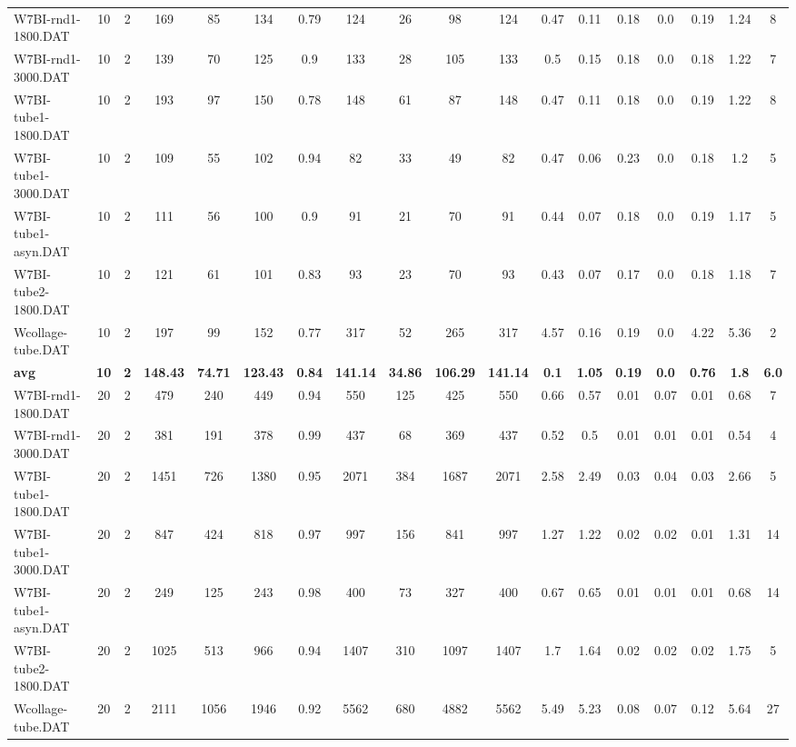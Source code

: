 \begin{sidewaystable}[h]
{\begin{tabular}{lccccccccccccccccc}
W7BI-rnd1-1800.DAT & 10 & 2 & 169 & 85 & 134 & 0.79 & 124 & 26 & 98 & 124 & 0.47 & 0.11 & 0.18 & 0.0 & 0.19 & 1.24 & 8\\
W7BI-rnd1-3000.DAT & 10 & 2 & 139 & 70 & 125 & 0.9 & 133 & 28 & 105 & 133 & 0.5 & 0.15 & 0.18 & 0.0 & 0.18 & 1.22 & 7\\
W7BI-tube1-1800.DAT & 10 & 2 & 193 & 97 & 150 & 0.78 & 148 & 61 & 87 & 148 & 0.47 & 0.11 & 0.18 & 0.0 & 0.19 & 1.22 & 8\\
W7BI-tube1-3000.DAT & 10 & 2 & 109 & 55 & 102 & 0.94 & 82 & 33 & 49 & 82 & 0.47 & 0.06 & 0.23 & 0.0 & 0.18 & 1.2 & 5\\
W7BI-tube1-asyn.DAT & 10 & 2 & 111 & 56 & 100 & 0.9 & 91 & 21 & 70 & 91 & 0.44 & 0.07 & 0.18 & 0.0 & 0.19 & 1.17 & 5\\
W7BI-tube2-1800.DAT & 10 & 2 & 121 & 61 & 101 & 0.83 & 93 & 23 & 70 & 93 & 0.43 & 0.07 & 0.17 & 0.0 & 0.18 & 1.18 & 7\\
Wcollage-tube.DAT & 10 & 2 & 197 & 99 & 152 & 0.77 & 317 & 52 & 265 & 317 & 4.57 & 0.16 & 0.19 & 0.0 & 4.22 & 5.36 & 2\\
\cline{1-18} \textbf{avg} & \textbf{10} & \textbf{2} & \textbf{148.43} & \textbf{74.71} & \textbf{123.43} & \textbf{0.84} & \textbf{141.14} & \textbf{34.86} & \textbf{106.29} & \textbf{141.14} & \textbf{0.1} & \textbf{1.05} & \textbf{0.19} & \textbf{0.0} & \textbf{0.76} & \textbf{1.8} & \textbf{6.0} \\ \cline{1-18}
W7BI-rnd1-1800.DAT & 20 & 2 & 479 & 240 & 449 & 0.94 & 550 & 125 & 425 & 550 & 0.66 & 0.57 & 0.01 & 0.07 & 0.01 & 0.68 & 7\\
W7BI-rnd1-3000.DAT & 20 & 2 & 381 & 191 & 378 & 0.99 & 437 & 68 & 369 & 437 & 0.52 & 0.5 & 0.01 & 0.01 & 0.01 & 0.54 & 4\\
W7BI-tube1-1800.DAT & 20 & 2 & 1451 & 726 & 1380 & 0.95 & 2071 & 384 & 1687 & 2071 & 2.58 & 2.49 & 0.03 & 0.04 & 0.03 & 2.66 & 5\\
W7BI-tube1-3000.DAT & 20 & 2 & 847 & 424 & 818 & 0.97 & 997 & 156 & 841 & 997 & 1.27 & 1.22 & 0.02 & 0.02 & 0.01 & 1.31 & 14\\
W7BI-tube1-asyn.DAT & 20 & 2 & 249 & 125 & 243 & 0.98 & 400 & 73 & 327 & 400 & 0.67 & 0.65 & 0.01 & 0.01 & 0.01 & 0.68 & 14\\
W7BI-tube2-1800.DAT & 20 & 2 & 1025 & 513 & 966 & 0.94 & 1407 & 310 & 1097 & 1407 & 1.7 & 1.64 & 0.02 & 0.02 & 0.02 & 1.75 & 5\\
Wcollage-tube.DAT & 20 & 2 & 2111 & 1056 & 1946 & 0.92 & 5562 & 680 & 4882 & 5562 & 5.49 & 5.23 & 0.08 & 0.07 & 0.12 & 5.64 & 27\\

\end{tabular}}
\end{sidewaystable}
